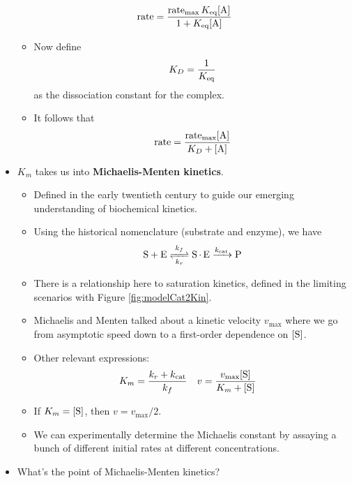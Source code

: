 \documentclass[../notes.tex]{subfiles}
\begin{document}
\begin{itemize}
\begin{equation*}
        \rate = \frac{\rate_\text{max}\Keq\cnc{A}}{1+\Keq\cnc{A}}
    \end{equation*}
    \begin{itemize}
        \item Now define
        \begin{equation*}
            K_D = \frac{1}{K_\textup{eq}}
        \end{equation*}
        as the dissociation constant for the  complex.
        \item It follows that
        \begin{equation*}
            \rate = \frac{\rate_\text{max}\cnc{A}}{K_D+\cnc{A}}
        \end{equation*}
    \end{itemize}
    \item $K_m$ takes us into \textbf{Michaelis-Menten kinetics}.
    \begin{itemize}
        \item Defined in the early twentieth century to guide our emerging understanding of biochemical kinetics.
        \item Using the historical nomenclature (substrate and enzyme), we have
        \begin{equation*}
            \ce{S + E <=>[$k_f$][$k_r$] S*E ->[$k_\text{cat}$] P}
        \end{equation*}
        \item There is a relationship here to saturation kinetics, defined in the limiting scenarios with Figure \ref{fig:modelCat2Kin}.
        \item Michaelis and Menten talked about a kinetic velocity $v_\text{max}$ where we go from asymptotic speed down to a first-order dependence on $\cnc{S}$.
        \item Other relevant expressions:
        \begin{align*}
            K_m &= \frac{k_r+k_\text{cat}}{k_f}&
            v &= \frac{v_\text{max}\cnc{S}}{K_m+\cnc{S}}
        \end{align*}
        \item If $K_m=\cnc{S}$, then $v=v_\text{max}/2$.
        \item We can experimentally determine the Michaelis constant by assaying a bunch of different initial rates at different concentrations.
    \end{itemize}
    \item What's the point of Michaelis-Menten kinetics?
    \begin{figure}[h!]

\end{figure}
\end{itemize}
\end{document}
